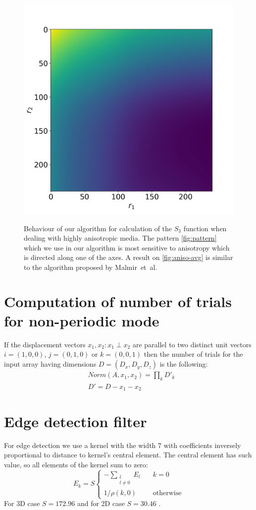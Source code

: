 \documentclass[reprint,amsmath,amssymb,aps,pre,showkeys,showpacs]{revtex4-1}
\begin{document}
\begin{figure}[tp]
{    \includegraphics[width=0.3\linewidth]{images/aniso-avg-s3.png}
    \label{fig:aniso-avg}}
  \caption[]{Behaviour of our algorithm for calculation of the $S_3$ function
    when dealing with highly anisotropic media. The pattern \cref{fig:pattern}
    which we use in our algorithm is most sensitive to anisotropy which is
    directed along one of the axes. A result on \cref{fig:aniso-avg} is similar
    to the algorithm proposed by Malmir~et~al.}
  \label{fig:aniso}
\end{figure}

\appendix
\section{Computation of number of trials for non-periodic mode}
\label{sec:number-of-trials}
If the displacement vectors $x_1, x_2: x_1 \perp x_2$ are parallel to two
distinct unit vectors $i=(1,0,0)$, $j=(0,1,0)$ or $k=(0,0,1)$ then the number of
trials for the input array having dimensions $D = (D_x, D_y, D_z)$ is the
following:
\begin{equation}
  \begin{aligned}
    & Norm(A, x_1, x_2) = \prod_k D'_k \\
    & D' = D - x_1 - x_2
  \end{aligned}
\end{equation}

\section{Edge detection filter}
\label{sec:filter}
For edge detection we use a kernel with the width 7 with coefficients inversely
proportional to distance to kernel's central element. The central element has
such value, so all elements of the kernel sum to zero:
\begin{equation}
  E_k = S \left\{
  \begin{array}{ll}
    -\sum\limits_{\substack{l \\ l \ne 0}} E_l & \quad k = 0 \\
    1 / \rho(k, 0) & \quad \text{otherwise}
  \end{array}
  \right.
\end{equation}
For 3D case $S=172.96$ and for 2D case $S=30.46$ \cite{postnicov20232}.


\end{document}
